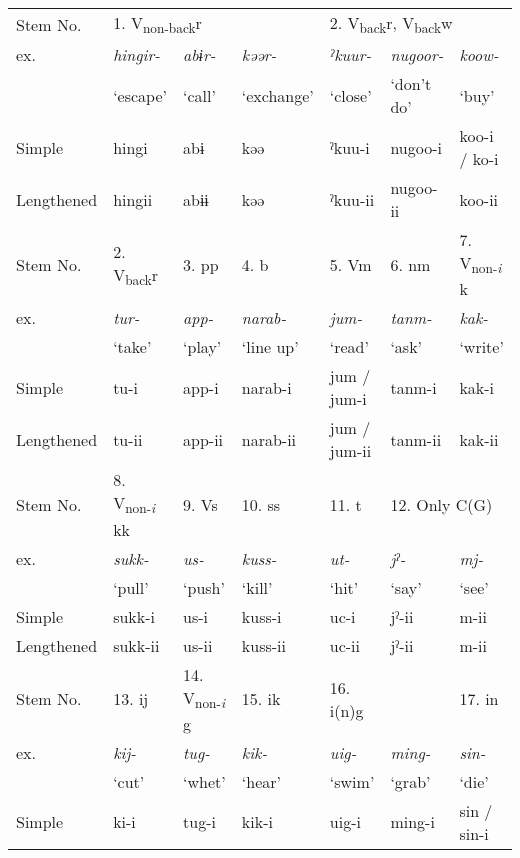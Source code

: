 \tabletail{}
\tablelasttail{}
\begin{tabularx}{\textwidth}{XXXXXXX}
\lsptoprule

\raggedleft Stem No. & \multicolumn{3}{X}{{ 1. V\textsubscript{non-back}r}} & \multicolumn{3}{X}{{ 2. V\textsubscript{back}r, V\textsubscript{back}w}}\\
\raggedleft ex. & {\itshape hingir-} & {\itshape abɨr-} & {\itshape kəər-} & {\itshape ˀkuur-} & {\itshape nugoor-} & {\itshape koow-}\\
& ‘escape’ & ‘call’ & ‘exchange’ & ‘close’ & ‘don’t do’ & ‘buy’\\
Simple & hingi & abɨ & kəə & ˀkuu-i & nugoo-i & koo-i / ko-i\\
Lengthened & hingii & abɨɨ & kəə & ˀkuu-ii & nugoo-ii & koo-ii\\
\raggedleft Stem No. & { 2. V\textsubscript{back}r} & 3. pp & 4. b & 5. Vm & 6. nm & { 7. V\textsubscript{non-}\textit{\textsubscript{i} }k}\\
\raggedleft ex. & {\itshape tur-} & {\itshape app-} & {\itshape narab-} & {\itshape jum-} & {\itshape tanm-} & {\itshape kak-}\\
& ‘take’ & ‘play’ & ‘line up’ & ‘read’ & ‘ask’ & ‘write’\\
Simple & tu-i & app-i & narab-i & jum / jum-i & tanm-i & kak-i\\
Lengthened & tu-ii & app-ii & narab-ii & jum / jum-ii & tanm-ii & kak-ii\\
\raggedleft Stem No. & 8. V\textsubscript{non-}\textit{\textsubscript{i} }kk & 9. Vs & 10. ss & 11. t & \multicolumn{2}{X}{12. Only C(G)}\\
\raggedleft ex. & {\itshape sukk-} & {\itshape us-} & {\itshape kuss-} & {\itshape ut-} & {\itshape jˀ-} & {\itshape mj-}\\
& ‘pull’ & ‘push’ & ‘kill’ & ‘hit’ & ‘say’ & ‘see’\\
Simple & sukk-i & us-i & kuss-i & uc-i & jˀ-ii & m-ii\\
Lengthened & sukk-ii & us-ii & kuss-ii & uc-ii & jˀ-ii & m-ii\\
\raggedleft Stem No. & 13. ij & 14. V\textsubscript{non-}\textit{\textsubscript{i}} g & 15. ik & 16. i(n)g &  & 17. in\\
\raggedleft ex. & {\itshape kij-} & {\itshape tug-} & {\itshape kik-} & {\itshape uig-} & {\itshape ming-} & {\itshape sin-}\\
& ‘cut’ & ‘whet’ & ‘hear’ & ‘swim’ & ‘grab’ & ‘die’\\
Simple & ki-i & tug-i & kik-i & uig-i & ming-i & sin / sin-i\\

\end{tabularx}
